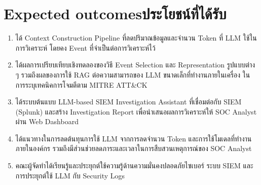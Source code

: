 \section{\ifenglish Expected outcomes\else ประโยชน์ที่ได้รับ\fi}
\begin{enumerate}
    \item ได้ Context Construction Pipeline ที่ลดปริมาณข้อมูลและจำนวน Token ที่ LLM ใช้ในการวิเคราะห์
          โดยคง Event ที่จำเป็นต่อการวิเคราะห์ไว้

    \item ได้ผลการเปรียบเทียบเชิงทดลองของวิธี Event Selection และ Representation รูปแบบต่าง ๆ
          รวมถึงผลของการใช้ RAG ต่อความสามารถของ LLM ขนาดเล็กที่ทำงานภายในเครื่อง
          ในการระบุเทคนิคการโจมตีตาม MITRE ATT\&CK

    \item ได้ระบบต้นแบบ LLM-based SIEM Investigation Assistant ที่เชื่อมต่อกับ SIEM (Splunk)
          และสร้าง Investigation Report เพื่อนำเสนอผลการวิเคราะห์ให้ SOC Analyst ผ่าน Web Dashboard

    \item ได้แนวทางในการลดต้นทุนการใช้ LLM จากการลดจำนวน Token และการใช้โมเดลที่ทำงานภายในองค์กร
          รวมถึงมีส่วนช่วยลดภาระและเวลาในการสืบสวนเหตุการณ์ของ SOC Analyst

    \item คณะผู้จัดทำได้เรียนรู้และประยุกต์ใช้ความรู้ด้านความมั่นคงปลอดภัยไซเบอร์ ระบบ SIEM
          และการประยุกต์ใช้ LLM กับ Security Logs
\end{enumerate}



